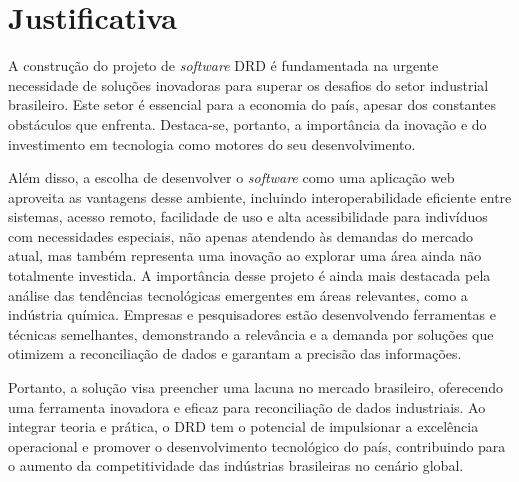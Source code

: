 \section{Justificativa}

A construção do projeto de \textit{software} DRD é fundamentada na urgente necessidade de soluções inovadoras para superar os desafios do setor industrial brasileiro. Este setor é essencial para a economia do país, apesar dos constantes obstáculos que enfrenta. Destaca-se, portanto, a importância da inovação e do investimento em tecnologia como motores do seu desenvolvimento.

Além disso, a escolha de desenvolver o \textit{software} como uma aplicação web aproveita as vantagens desse ambiente, incluindo interoperabilidade eficiente entre sistemas, acesso remoto, facilidade de uso e alta acessibilidade para indivíduos com necessidades especiais, não apenas atendendo às demandas do mercado atual, mas também representa uma inovação ao explorar uma área ainda não totalmente investida. A importância desse projeto é ainda mais destacada pela análise das tendências tecnológicas emergentes em áreas relevantes, como a indústria química. Empresas e pesquisadores estão desenvolvendo ferramentas e técnicas semelhantes, demonstrando a relevância e a demanda por soluções que otimizem a reconciliação de dados e garantam a precisão das informações.

Portanto, a solução visa preencher uma lacuna no mercado brasileiro, oferecendo uma ferramenta inovadora e eficaz para reconciliação de dados industriais. Ao integrar teoria e prática, o DRD tem o potencial de impulsionar a excelência operacional e promover o desenvolvimento tecnológico do país, contribuindo para o aumento da competitividade das indústrias brasileiras no cenário global.
